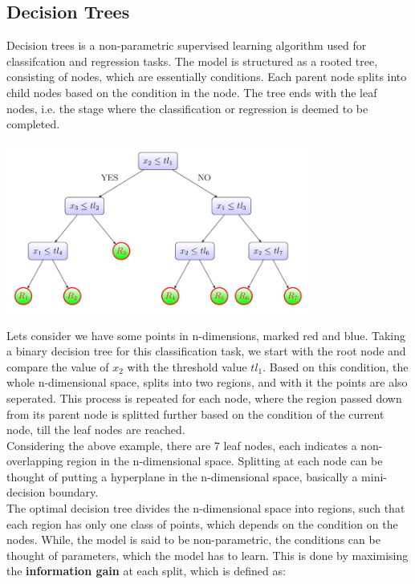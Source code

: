 \documentclass[12pt]{article}
\begin{document}
\subsection{Decision Trees}
Decision trees is a non-parametric supervised learning algorithm used for classifcation and regression tasks. The model is structured as a rooted tree, consisting of nodes, which are essentially conditions. Each parent node splits into child nodes based on the condition in the node. The tree ends with the leaf nodes, i.e. the stage where the classification or regression is deemed to be completed.\\

\begin{center}
    \includegraphics[width=10cm]{decision-tree-eg.png}
\end{center}
Lets consider we have some points in n-dimensions, marked red and blue. Taking a binary decision tree for this classification task, we start with the root node and compare the value of $x_2$ with the threshold value $tl_1$. Based on this condition, the whole n-dimensional space, splits into two regions, and with it the points are also seperated. This process is repeated for each node, where the region passed down from its parent node is splitted further based on the condition of the current node, till the leaf nodes are reached. \\
Considering the above example, there are 7 leaf nodes, each indicates a non-overlapping region in the n-dimensional space. Splitting at each node can be thought of putting a hyperplane in the n-dimensional space, basically a mini-decision boundary.\\
The optimal decision tree divides the n-dimensional space into regions, such that each region has only one class of points, which depends on the condition on the nodes. While, the model is said to be non-parametric, the conditions can be thought of parameters, which the model has to learn. This is done by maximising the \textbf{information gain} at each split, which is defined as:\\
\end{document}
